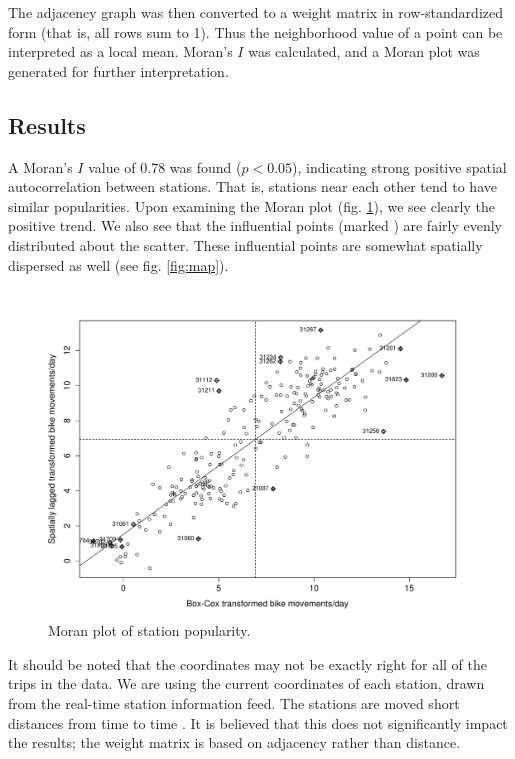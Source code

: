 \documentclass[letterpaper,11pt]{article}
\begin{document}
The adjacency graph was then converted to a weight matrix in
row-standardized form (that is, all rows sum to 1). Thus the
neighborhood value of a point can be interpreted as a local
mean. Moran's $I$ was calculated, and a Moran plot was generated for
further interpretation.

\subsection{Results}

A Moran's $I$ value of 0.78 was found ($p < 0.05$), indicating strong
positive spatial autocorrelation between stations. That is, stations
near each other tend to have similar popularities. Upon examining the
Moran plot (fig. \ref{fig:moran}), we see clearly the positive
trend. We also see that the influential points (marked
\rlap{\tiny{+}}{$\diamond$}) are fairly evenly distributed about the
scatter. These influential points are somewhat spatially dispersed as
well (see fig. \ref{fig:map}).

\begin{figure}[t]
  \includegraphics[width=\textwidth]{moran_plot.pdf}
  \caption{\label{fig:moran} Moran plot of station popularity.}
\end{figure}


It should be noted that the coordinates may not be exactly right for
all of the trips in the data. We are using the current coordinates of
each station, drawn from the real-time station information feed. The
stations are moved short distances from time to time
\autocite{Wong2012}. It is believed that this does not significantly
impact the results; the weight matrix is based on adjacency rather
than distance.
\end{document}
